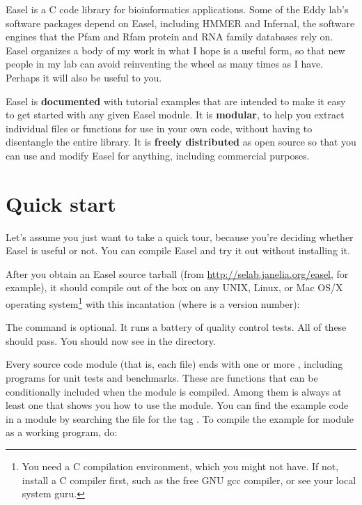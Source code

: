 



Easel is a C code library for bioinformatics applications.  Some of
the Eddy lab's software packages depend on Easel, including HMMER and
Infernal, the software engines that the Pfam and Rfam protein and RNA
family databases rely on. Easel organizes a body of my work in what I
hope is a useful form, so that new people in my lab can avoid
reinventing the wheel as many times as I have. Perhaps it will also be
useful to you.

Easel is \textbf{documented} with tutorial examples that are intended
to make it easy to get started with any given Easel module. It is
\textbf{modular}, to help you extract individual files or functions
for use in your own code, without having to disentangle the entire
library. It is \textbf{freely distributed} as open source so that you
can use and modify Easel for anything, including commercial purposes.

\section{Quick start}

Let's assume you just want to take a quick tour, because you're
deciding whether Easel is useful or not. You can compile Easel and try
it out without installing it. 

After you obtain an Easel source tarball (from
\url{http://selab.janelia.org/easel}, for example), it should compile
out of the box on any UNIX, Linux, or Mac OS/X operating
system\footnote{You need a C compilation environment, which you might
not have. If not, install a C compiler first, such as the free GNU gcc
compiler, or see your local system guru.} with this incantation
(where  is a version number):

\begin{cchunk}
\end{cchunk}

The  command is optional. It runs a battery of
quality control tests. All of these should pass. You should now see
 in the directory.

Every source code module (that is, each  file) ends with one
or more , including programs for unit tests
and benchmarks. These are  functions that can be
conditionally included when the module is compiled. Among them is
always at least one  that shows you how to use
the module. You can find the example code in a module  by
searching the  file for the tag
. To compile the example for module
 as a working program, do:

